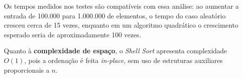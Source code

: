\FloatBarrier

\qquad Os tempos medidos nos testes são compatíveis com essa análise: ao aumentar a entrada de 100.000 para 1.000.000 de elementos, o tempo do caso aleatório cresceu cerca de 15 vezes, enquanto em um algoritmo quadrático o crescimento esperado seria de aproximadamente 100 vezes.

\qquad Quanto à \textbf{complexidade de espaço}, o \textit{Shell Sort} apresenta complexidade $O(1)$, pois a ordenação é feita \textit{in-place}, sem uso de estruturas auxiliares proporcionais a $n$.